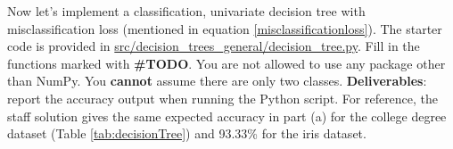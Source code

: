 \item {} Now let's implement a classification, univariate decision tree with misclassification loss (mentioned in equation \ref{misclassificationloss}). The starter code is provided in \url{src/decision_trees_general/decision_tree.py}. Fill in the functions marked with \textbf{\#TODO}. You are not allowed to use any package other than NumPy. You \textbf{cannot} assume there are only two classes. \textbf{Deliverables}: report the accuracy output when running the Python script. For reference, the staff solution gives the same expected accuracy in part (a) for the college degree dataset (Table \ref{tab:decisionTree}) and 93.33\% for the iris dataset.